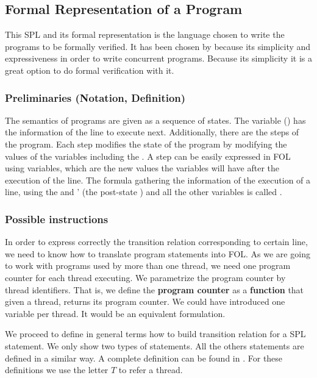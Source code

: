 \subsection{Formal Representation of a Program}

This \gls{SPL} and its formal representation is the language chosen to write the programs to be formally verified.
%
It has been chosen by \citep{thesisAle} because its simplicity and expressiveness in order to write concurrent programs. 
%
Because its simplicity it is a great option to do formal verification with it.


\subsubsection{Preliminaries (Notation, Definition)}

The semantics of programs are given as a sequence of states.
%
The \pc\; variable () has the information of the line to execute next. 
%
Additionally, there are the steps of the program. Each step modifies the state of the program by modifying the values of the variables including the \pc.
%
A step can be easily expressed in \gls{FOL} using  variables, which are the new values the variables will have after the execution of the line.
%
The formula gathering the information of the execution of a line, using the \pc and \pc' (the post-state \pc) and all the other variables is called .


\subsubsection{Possible instructions}
%
In order to express correctly the transition relation corresponding to certain line, we need to know how to translate program statements into \gls{FOL}.
%
As we are going to work with programs used by more than one thread, we need one program counter for each thread executing.
%
We parametrize the program counter by thread identifiers. 
%
That is, we define the \textbf{program counter} as a \textbf{function} that given a thread, returns its program counter. 
%
We could have introduced one variable per thread.
%
It would be an equivalent formulation. 


We proceed to define in general terms how to build transition relation for a \gls{SPL} statement.
%
We only show two types of statements. All the others statements are defined in a similar way.
%
A complete definition can be found in \cite{SPL}.
%
For these definitions we use the letter $T$ to refer a thread.
%


